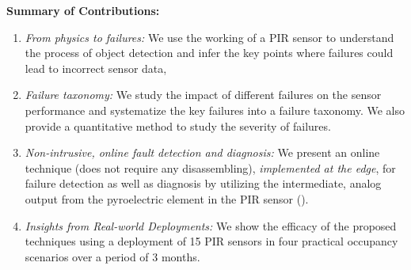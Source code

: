 \noindent \textbf{Summary of Contributions:}
\begin{enumerate}[leftmargin=*]
	\itemsep0pt
	\item \textit{From physics to failures:} We use the working of a PIR sensor to understand the process of object detection and infer the key points where failures could lead to incorrect sensor data,
	\item \textit{Failure taxonomy:} We study the impact of different failures on the sensor performance and systematize the key failures into a failure taxonomy. We also provide a quantitative method to study the severity of failures.
	
	\item \textit{Non-intrusive, online fault detection and diagnosis:} We present an online technique (does not require any disassembling), \emph{implemented at the edge}, for failure detection as well as diagnosis by utilizing the intermediate, analog output from the pyroelectric element in the PIR sensor (\aout). 
	\item \textit{Insights from Real-world Deployments:} We show the efficacy of the proposed techniques using a deployment of 15 PIR sensors in four practical occupancy scenarios over a period of 3 months.
\end{enumerate}


